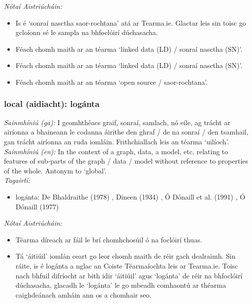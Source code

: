  \noindent \textit{Nótaí Aistriúcháin:}
\begin{itemize}
	\item Is é `sonraí nasctha saor-rochtana' atá ar Tearma.ie. Glactar leis sin toisc go gcloíonn sé le sampla na bhfoclóirí dúchasacha.
	\item Féach chomh maith ar an téarma `linked data (LD) / sonraí nasctha (SN)'.
	\item Féach chomh maith ar an téarma `linked data (LD) / sonraí nasctha (SN)'.
	\item Féach chomh maith ar an téarma `open source / saor-rochtana'.
\end{itemize}


\subsubsection*{local (aidiacht): logánta}
 \noindent \textit{Sainmhíniú (ga):} I gcomhthéacs graif, sonraí, samlach, nó eile, ag trácht ar airíonna a bhaineann le codanna áirithe den ghraf / de na sonraí / den tsamhail, gan trácht airíonna an ruda iomláin. Frithchiallach leis an téarma `uilíoch'.
\\
 \noindent \textit{Sainmhíniú (en):} In the context of a graph, data, a model, etc, relating to features of sub-parts of the graph / data / model without reference to properties of the whole. Antonym to `global'.
\\
 \noindent \textit{Tagairtí:}
\begin{itemize}
	\item logánta: De Bhaldraithe (1978) \cite{de-bhaldraithe}, Dineen (1934) \cite{dineen}, Ó Dónaill et al. (1991) \cite{focloir-beag}, Ó Dónaill (1977) \cite{odonaill}
\end{itemize}

 \noindent \textit{Nótaí Aistriúcháin:}
\begin{itemize}
	\item Téarma díreach ar fáil le brí chomhchosúil ó na foclóirí thuas.
	\item Tá `áitiúil' iomlán ceart go leor chomh maith de réir gach dealraimh. Sin ráite, is é logánta a nglac an Coiste Téarmaíochta leis ar Tearma.ie. Toisc nach bhfuil difríocht ar bith idir `áitiúil' agus `logánta' de réir na bhfoclóirí dúchasacha, glacadh le `logánta' le go mbeadh comhaontú ar théarma caighdeánach amháin ann os a chomhair seo.
\end{itemize}


